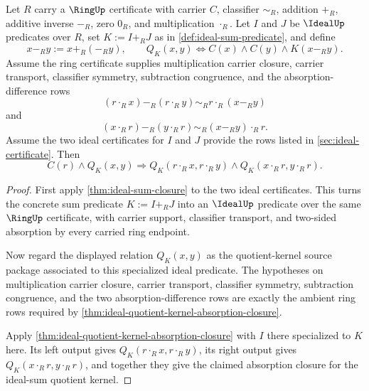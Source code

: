 \begin{theorem}
\label{thm:ideal-sum-quotient-kernel-absorption-closure}
Let $R$ carry a $\RingUp$ certificate with carrier $C$, classifier $\sim_R$, addition $+_R$, additive inverse $-_R$, zero $0_R$, and multiplication $\cdot_R$. Let $I$ and $J$ be $\IdealUp$ predicates over $R$, set $K:=I+_RJ$ as in \autoref{def:ideal-sum-predicate}, and define
$$
x-_R y:=x+_R(-_R y),
\qquad
Q_K(x,y)\Longleftrightarrow C(x)\land C(y)\land K(x-_R y).
$$
Assume the ring certificate supplies multiplication carrier closure, carrier transport, classifier symmetry, subtraction congruence, and the absorption-difference rows
$$
(r\cdot_R x)-_R(r\cdot_R y)\sim_R r\cdot_R(x-_R y)
$$
and
$$
(x\cdot_R r)-_R(y\cdot_R r)\sim_R (x-_R y)\cdot_R r.
$$
Assume the two ideal certificates for $I$ and $J$ provide the rows listed in \autoref{sec:ideal-certificate}. Then
$$
C(r)\land Q_K(x,y)
\Longrightarrow
Q_K(r\cdot_R x,r\cdot_R y)\land Q_K(x\cdot_R r,y\cdot_R r).
$$
\end{theorem}
\begin{proof}
First apply \autoref{thm:ideal-sum-closure} to the two ideal certificates. This turns the concrete sum predicate $K:=I+_RJ$ into an $\IdealUp$ predicate over the same $\RingUp$ certificate, with carrier support, classifier transport, and two-sided absorption by every carried ring endpoint.

Now regard the displayed relation $Q_K(x,y)$ as the quotient-kernel source package associated to this specialized ideal predicate. The hypotheses on multiplication carrier closure, carrier transport, classifier symmetry, subtraction congruence, and the two absorption-difference rows are exactly the ambient ring rows required by \autoref{thm:ideal-quotient-kernel-absorption-closure}.

Apply \autoref{thm:ideal-quotient-kernel-absorption-closure} with $I$ there specialized to $K$ here. Its left output gives $Q_K(r\cdot_R x,r\cdot_R y)$, its right output gives $Q_K(x\cdot_R r,y\cdot_R r)$, and together they give the claimed absorption closure for the ideal-sum quotient kernel.
\end{proof}

